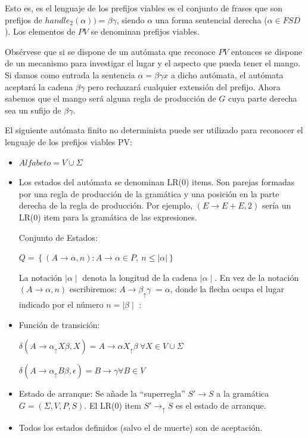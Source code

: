 Esto es, es el lenguaje de los prefijos viables es el 
conjunto de frases que son prefijos de 
$handle_2(\alpha)) =  \beta \gamma$, 
siendo $\alpha$ una forma sentencial derecha ($\alpha \in FSD$). Los
elementos de $PV$ se denominan prefijos viables.

Obsérvese que si se dispone de un autómata que reconoce 
$PV$ entonces se dispone de un mecanismo para investigar el lugar y 
el aspecto que pueda tener el mango. Si damos como 
entrada la sentencia $\alpha = \beta \gamma x$
a dicho autómata, el autómata aceptará la cadena $\beta \gamma$ pero rechazará
cualquier extensión del prefijo. Ahora sabemos que el mango 
será alguna regla de producción de $G$ cuya parte derecha 
sea un sufijo de  $\beta \gamma$.

\begin{definition}
\label{definition:slrautomata}
El siguiente autómata finito no determinista puede ser utilizado para
reconocer el lenguaje de los prefijos viables PV:
\begin{itemize}
\item
$Alfabeto = V \cup \Sigma$
\item
Los estados del autómata se denominan LR(0) items. Son parejas formadas
por una regla de producción de la gramática y una posición en la parte derecha 
de la regla de producción. Por ejemplo, $(E \rightarrow E + E, 2)$ sería un
LR(0) item para la gramática de las expresiones.

Conjunto de Estados:

$Q =  \left \{ (A \rightarrow \alpha, n) :  A \rightarrow \alpha \in P,\ n \le |\alpha| \right \}$

 La notación $\mid \alpha \mid$ denota la longitud de la cadena $\mid \alpha \mid$.
 En vez de la notación $(A \rightarrow \alpha, n)$ escribiremos: 
 $A \rightarrow \beta _\uparrow \gamma$ $ = \alpha$, 
 donde la flecha ocupa el lugar indicado por el número $n = \mid \beta \mid$ :
\item
Función de transición:

$\delta(A \rightarrow \alpha _\uparrow X \beta, X) = A \rightarrow \alpha X _\uparrow \beta\ \forall X \in  V \cup \Sigma$ 

$\delta(A \rightarrow \alpha _\uparrow B \beta, \epsilon) = B \rightarrow \gamma  \forall B \in  V$ 
\item
Estado de arranque: Se añade la ``superregla'' $S' \rightarrow S$ a la gramática $G = (\Sigma,V,P,S)$. El LR(0) item 
$S' \rightarrow _\uparrow S$ es el estado de arranque.
\item
Todos los estados definidos (salvo el de muerte) son de aceptación.
\end{itemize}
\end{definition}

